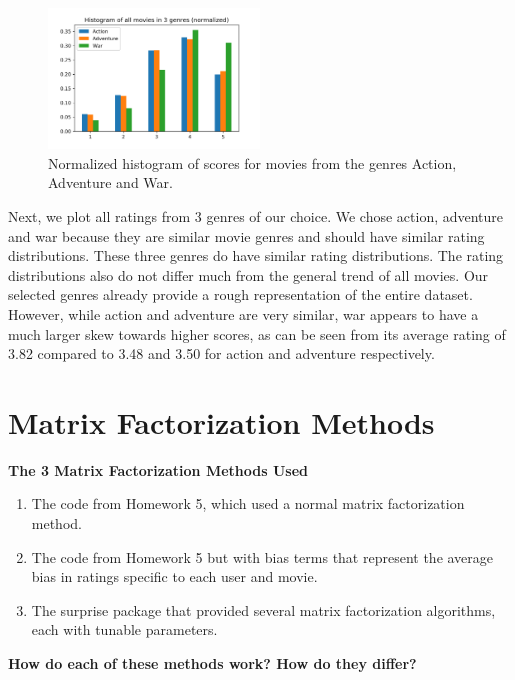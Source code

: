 \begin{figure}[H]
	\centering
	\includegraphics[width=0.5\textwidth]{Fig4-4-4.png}
	\caption{Normalized histogram of scores for movies from the genres Action, Adventure and War.}
\end{figure}

Next, we plot all ratings from 3 genres of our choice. We chose action, adventure and war because they are similar movie genres and should have similar rating distributions. These three genres do have similar rating distributions. The rating distributions also do not differ much from the general trend of all movies. Our selected genres already provide a rough representation of the entire dataset. However, while action and adventure are very similar, war appears to have a much larger skew towards higher scores, as can be seen from its average rating of 3.82 compared to 3.48 and 3.50 for action and adventure respectively.

\section{Matrix Factorization Methods}

\textbf{The 3 Matrix Factorization Methods Used}
\begin{enumerate}
    \item The code from Homework 5, which used a normal matrix factorization method.
    
    \item The code from Homework 5 but with bias terms that represent the average bias in ratings specific to each user and movie.

    \item The surprise package that provided several matrix factorization algorithms, each with tunable parameters.

\end{enumerate}

\textbf{How do each of these methods work? How do they differ?} \newline
    
